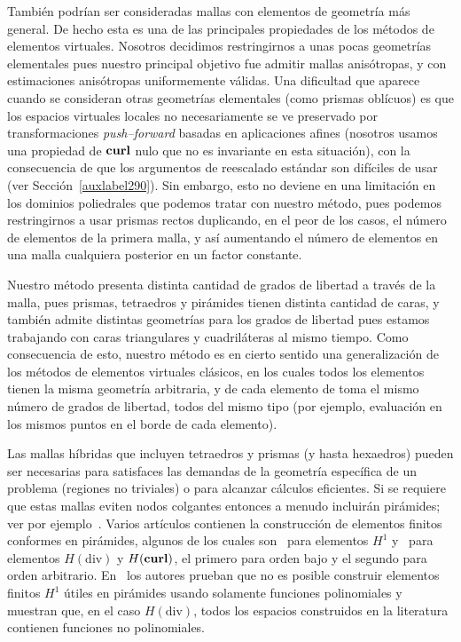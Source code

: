 Tambi\'en podr\'ian ser consideradas mallas con elementos
de geometr\'ia m\'as general. De hecho esta es una 
de las principales propiedades de los m\'etodos
de elementos virtuales. Nosotros decidimos
restringirnos a unas pocas geometr\'ias elementales
pues nuestro principal objetivo fue admitir 
mallas anis\'otropas, y con estimaciones anis\'otropas
uniformemente v\'alidas. Una dificultad que aparece
cuando se consideran otras geometr\'ias elementales 
(como prismas obl\'icuos) es que los espacios virtuales
locales no necesariamente se ve preservado 
por transformaciones \emph{push--forward} basadas 
en aplicaciones afines (nosotros 
usamos una propiedad de $\textbf{curl}$ nulo que no
es invariante en esta situaci\'on), con
la consecuencia de que los argumentos de
reescalado est\'andar son dif\'iciles de usar
(ver Secci\'on~\ref{auxlabel290}). Sin embargo, esto no deviene
en una limitaci\'on en los dominios poliedrales que
podemos tratar con nuestro m\'etodo, pues podemos
restringirnos a usar prismas rectos duplicando, en el
peor de los casos, el n\'umero de elementos de la
primera malla, y as\'i aumentando el n\'umero de elementos
en una malla cualquiera posterior en un factor constante.

Nuestro m\'etodo presenta distinta cantidad de grados
de libertad a trav\'es de la malla, pues prismas, tetraedros
y pir\'amides tienen distinta cantidad de caras, y tambi\'en
admite distintas geometr\'ias para los grados de libertad pues
estamos trabajando con caras triangulares y cuadril\'ateras
al mismo tiempo. Como consecuencia de esto, nuestro m\'etodo
es en cierto sentido una generalizaci\'on de los
m\'etodos de elementos virtuales cl\'asicos, en los cuales todos
los elementos tienen la misma geometr\'ia arbitraria, y de 
cada elemento de toma el mismo n\'umero de grados de libertad, todos
del mismo tipo (por ejemplo, evaluaci\'on en los mismos puntos en
el borde de cada elemento).

Las mallas h\'ibridas que incluyen tetraedros y prismas (y hasta
hexaedros) pueden ser necesarias para satisfaces las demandas
de la geometr\'ia espec\'ifica de un problema (regiones no triviales)
o para alcanzar c\'alculos eficientes. Si se requiere que estas mallas
eviten nodos colgantes entonces a menudo incluir\'an pir\'amides; ver
por ejemplo~\cite{owenSaigal}. Varios art\'iculos contienen
la construcci\'on de elementos finitos conformes en pir\'amides,
algunos de los cuales son~\cite{bergot} 
para elementos $H^1$ y~\cite{gh99, Nigam-2012}
para elementos $H(\mbox{div})$ y $H({\bf curl})$,
el primero para orden bajo y el segundo para orden arbitrario.
En~\cite{Nigam-2012} los autores prueban que no es posible
construir elementos finitos $H^1$ \'utiles en pir\'amides
usando solamente funciones polinomiales y muestran que, 
en el caso $H(\mbox{div})$,
todos los espacios construidos en la literatura contienen
funciones no polinomiales.

